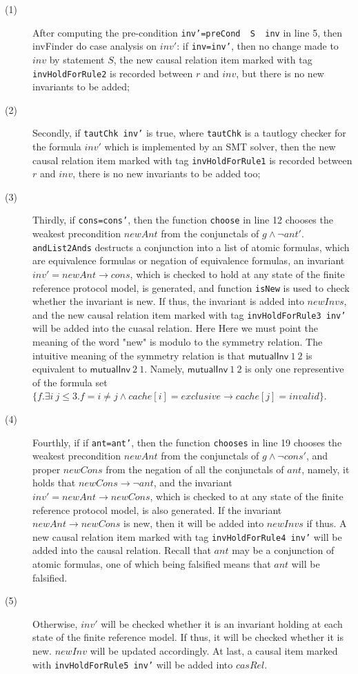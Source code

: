\documentclass{llncs}
\begin{document}
 \begin{description}
 \item[(1)] After computing the pre-condition {\tt inv'=preCond~ S ~inv} in line 5, then  {\sf invFinder} do case analysis on $inv'$: if {\tt inv=inv'}, then no change made to $inv$ by statement $S$, the new causal relation item marked with tag {\tt invHoldForRule2} is recorded between $r$ and $inv$, but there is no new invariants to be added;
  \item[(2)]    Secondly, if {\tt tautChk inv'} is true, where {\tt tautChk} is a tautlogy checker for the formula $inv'$ which is implemented
  by an SMT solver, then  the new causal relation item marked with tag {\tt invHoldForRule1} is recorded between $r$ and $inv$,  there is no new invariants to be added too;

 \item[(3)]   Thirdly, if  {\tt cons=cons'}, then the function {\tt choose} in line 12 chooses the weakest precondition $newAnt$ from the conjunctals of
 $g \wedge \neg  ant'$. {\tt andList2Ands} destructs a conjunction into a list of atomic formulas, which are equivalence formulas or negation of equivalence formulas, an   invariant $inv'=newAnt \longrightarrow cons$, which is checked to hold at any state of the finite reference protocol model,  is generated, and function {\tt isNew} is used to check whether the invariant is new. If thus, the invariant is  added into $newInvs$, and the new causal relation item marked with tag {\tt invHoldForRule3 inv'} will be added into the cuasal relation.
     Here Here we must point the meaning of the word "new" is modulo to the symmetry relation. The intuitive meaning of the symmetry relation is that $\mathsf{mutualInv}~1~2$ is equivalent to $\mathsf{mutualInv}~2~1$. Namely, $\mathsf{mutualInv}~1~2$  is only one representive of the formula set $\{f. \exists i~j \le 3.f=i\neq j \wedge cache[i]=exclusive\longrightarrow cache[j]=invalid \}$.

  \item[(4)]    Fourthly, if if  {\tt ant=ant'}, then the function {\tt chooses} in line 19 chooses the weakest precondition $newAnt$ from the conjunctals of
   $g \wedge \neg  cons'$, and proper  $newCons$ from the negation of all the conjunctals of $ant$, namely, it holds that $newCons \longrightarrow \neg ant$,
   and the invariant  $inv'=newAnt \longrightarrow newCons$, which is checked to  at any state of the finite reference protocol model,  is also generated.
   If the invariant $newAnt \longrightarrow newCons$ is new, then it will be added into $newInvs$ if thus.
   A new causal relation item marked with tag {\tt invHoldForRule4 inv'} will be added into the causal
   relation. Recall that $ant$ may be a conjunction of atomic
   formulas, one of which being falsified means that $ant$ will be
   falsified.

    \item[(5)] Otherwise, $inv'$ will be checked whether it is an invariant holding at each state of the finite reference model. If thus, it
    will be checked whether it is new. $newInv$ will be updated
    accordingly. At last, a causal item marked with {\tt invHoldForRule5
    inv'} will be added into $casRel$.
 \end{description}
\end{document}
